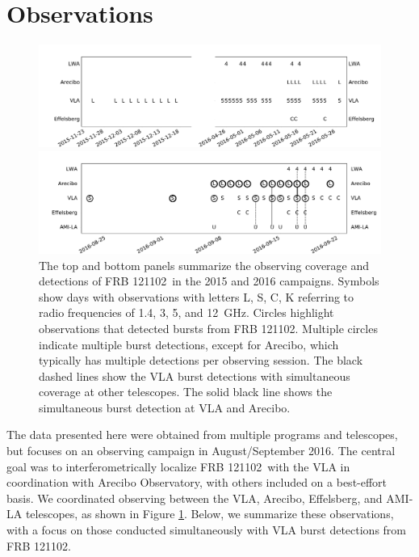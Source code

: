 \documentclass[twocolumn]{aastex61}
\newcommand{\frb}{FRB 121102}
\begin{document}
\section{Observations}

\begin{figure}[t]
\begin{center}
\includegraphics[width=2\columnwidth]{timeline0}

\includegraphics[width=2\columnwidth]{timeline}
\caption{The top and bottom panels summarize the observing coverage and detections of \frb\ in the 2015 and 2016 campaigns. Symbols show days with observations with letters L, S, C, K referring to radio frequencies of 1.4, 3, 5, and 12~GHz. Circles highlight observations that detected bursts from \frb. Multiple circles indicate multiple burst detections, except for Arecibo, which typically has multiple detections per observing session. The black dashed lines show the VLA burst detections with simultaneous coverage at other telescopes. The solid black line shows the simultaneous burst detection at VLA and Arecibo.
\label{fig:sched}}
\end{center}
\end{figure}

The data presented here were obtained from multiple programs and telescopes, but focuses on an observing campaign in August/September 2016. The central goal was to interferometrically localize \frb\ with the VLA in coordination with Arecibo Observatory, with others included on a best-effort basis. We coordinated observing between the VLA, Arecibo, Effelsberg, and AMI-LA telescopes, as shown in Figure \ref{fig:sched}. Below, we summarize these observations, with a focus on those conducted simultaneously with VLA burst detections from \frb.
\end{document}
